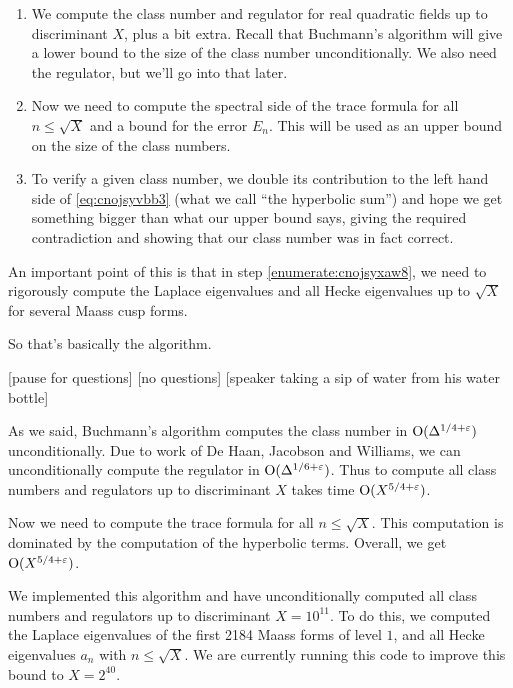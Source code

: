 \documentclass[reqno]{amsart} 
\begin{document}
\begin{enumerate}
\item We compute the class number and regulator for real quadratic fields up to discriminant $X$, plus a bit extra.  Recall that Buchmann's algorithm will give a lower bound to the size of the class number unconditionally.  We also need the regulator, but we'll go into that later.
\item\label{enumerate:cnojsyxaw8} Now we need to compute the spectral side of the trace formula for all $n \leq \sqrt{X}$ and a bound for the error $E_n$.  This will be used as an upper bound on the size of the class numbers.
\item To verify a given class number, we double its contribution to the left hand side of  \eqref{eq:cnojsyvbb3} (what we call ``the hyperbolic sum'') and hope we get something bigger than what our upper bound says, giving the required contradiction and showing that our class number was in fact correct.
\end{enumerate}
An important point of this is that in step \eqref{enumerate:cnojsyxaw8}, we need to rigorously compute the Laplace eigenvalues and all Hecke eigenvalues up to $\sqrt{X}$ for several Maass cusp forms.

So that's basically the algorithm.

[pause for questions]  [no questions]  [speaker taking a sip of water from his water bottle]

As we said, Buchmann's algorithm computes the class number in $\operatorname{O}(\Delta^{1/4 + \varepsilon})$ unconditionally.  Due to work of De Haan, Jacobson and Williams, we can unconditionally compute the regulator in $\operatorname{O}(\Delta^{1/6 + \varepsilon})$.  Thus to compute all class numbers and regulators up to discriminant $X$ takes time $\operatorname{O}(X^{5/4 + \varepsilon})$.

Now we need to compute the trace formula for all $n \leq \sqrt{X}$.  This computation is dominated by the computation of the hyperbolic terms.  Overall, we get $\operatorname{O}(X^{5/4 + \varepsilon})$.

We implemented this algorithm and have unconditionally computed all class numbers and regulators up to discriminant $X = 10^{11}$.  To do this, we computed the Laplace eigenvalues of the first 2184 Maass forms of level $1$, and all Hecke eigenvalues $a_n$ with $n \leq \sqrt{X}$.  We are currently running this code to improve this bound to $X = 2^{40}$.
\end{document}
